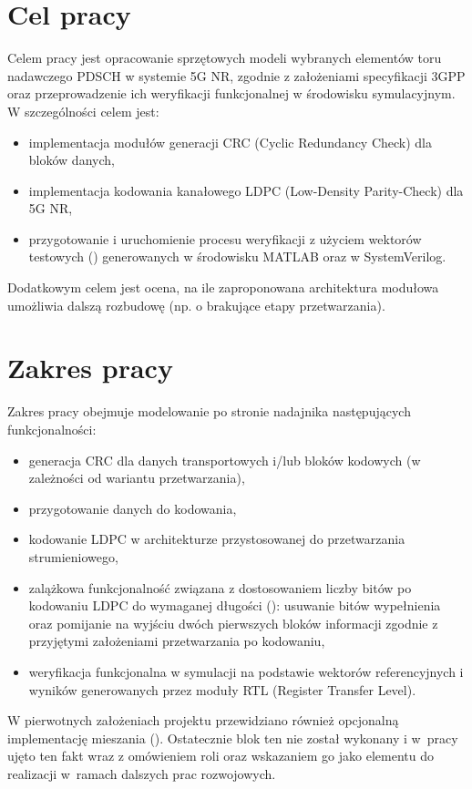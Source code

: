 \section{Cel pracy}
\label{sec:wstep_cel}
Celem pracy jest opracowanie sprzętowych modeli wybranych elementów toru nadawczego PDSCH w systemie 5G NR, zgodnie z założeniami specyfikacji 3GPP oraz przeprowadzenie ich weryfikacji funkcjonalnej w środowisku symulacyjnym. W szczególności celem jest:
\begin{itemize}
    \item implementacja modułów generacji CRC (Cyclic Redundancy Check) dla bloków danych,
    \item implementacja kodowania kanałowego LDPC (Low-Density Parity-Check) dla 5G NR,
    \item przygotowanie i uruchomienie procesu weryfikacji z użyciem wektorów testowych () generowanych w środowisku MATLAB oraz  w SystemVerilog.
\end{itemize}
Dodatkowym celem jest ocena, na ile zaproponowana architektura modułowa umożliwia dalszą rozbudowę (np. o brakujące etapy przetwarzania).

\section{Zakres pracy}
\label{sec:wstep_zakres}
Zakres pracy obejmuje modelowanie po stronie nadajnika następujących funkcjonalności:
\begin{itemize}
    \item generacja CRC dla danych transportowych i/lub bloków kodowych (w zależności od wariantu przetwarzania),
    \item przygotowanie danych do kodowania,
    \item kodowanie LDPC w architekturze przystosowanej do przetwarzania strumieniowego,
    \item zalążkowa funkcjonalność związana z dostosowaniem liczby bitów po kodowaniu LDPC do wymaganej długości (): usuwanie bitów wypełnienia oraz pomijanie na wyjściu dwóch pierwszych bloków informacji zgodnie z przyjętymi założeniami przetwarzania po kodowaniu,
    \item weryfikacja funkcjonalna w symulacji na podstawie wektorów referencyjnych i wyników generowanych przez moduły RTL (Register Transfer Level).
\end{itemize}

W pierwotnych założeniach projektu przewidziano również opcjonalną implementację mieszania (). Ostatecznie blok ten nie został wykonany i w~pracy ujęto ten fakt wraz z omówieniem roli  oraz wskazaniem go jako elementu do realizacji w~ramach dalszych prac rozwojowych.

